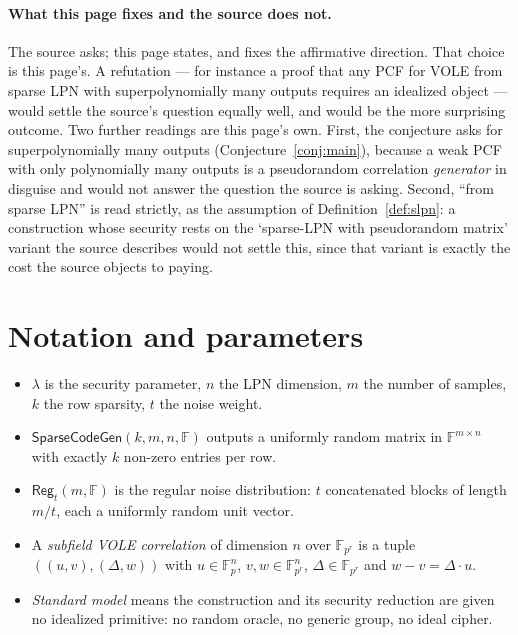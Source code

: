 \documentclass{aicr-conjecture}
\newcommand{\F}{\mathbb{F}}
\newcommand{\SparseCodeGen}{\mathsf{SparseCodeGen}}
\newcommand{\Reg}{\mathsf{Reg}}
\begin{document}
\paragraph{What this page fixes and the source does not.}
The source asks; this page states, and fixes the affirmative direction.
That choice is this page's. A refutation --- for instance a proof that
any PCF for VOLE from sparse LPN with superpolynomially many outputs
requires an idealized object --- would settle the source's question
equally well, and would be the more surprising outcome. Two further
readings are this page's own. First, the conjecture asks for
superpolynomially many outputs (Conjecture~\ref{conj:main}), because a
weak PCF with only polynomially many outputs is a pseudorandom
correlation \emph{generator} in disguise and would not answer the
question the source is asking. Second, ``from sparse LPN'' is read
strictly, as the assumption of Definition~\ref{def:slpn}: a construction
whose security rests on the `sparse-LPN with pseudorandom matrix'
variant the source describes would not settle this, since that variant
is exactly the cost the source objects to paying.

\section{Notation and parameters}\label{sec:notation}

\begin{itemize}[nosep]
  \item $\lambda$ is the security parameter, $n$ the LPN dimension, $m$
    the number of samples, $k$ the row sparsity, $t$ the noise weight.
  \item $\SparseCodeGen(k, m, n, \F)$ outputs a uniformly random matrix
    in $\F^{m \times n}$ with exactly $k$ non-zero entries per row.
  \item $\Reg_{t}(m, \F)$ is the regular noise distribution: $t$
    concatenated blocks of length $m/t$, each a uniformly random unit
    vector.
  \item A \emph{subfield VOLE correlation} of dimension $n$ over
    $\F_{p^{r}}$ is a tuple $((u, v), (\Delta, w))$ with
    $u \in \F_{p}^{n}$, $v, w \in \F_{p^{r}}^{n}$,
    $\Delta \in \F_{p^{r}}$ and $w - v = \Delta \cdot u$.
  \item \emph{Standard model} means the construction and its security
    reduction are given no idealized primitive: no random oracle, no
    generic group, no ideal cipher.
\end{itemize}
\end{document}

